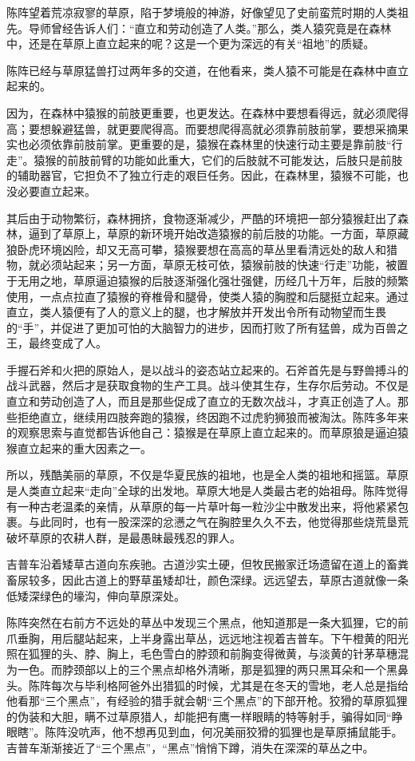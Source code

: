 \par 陈阵望着荒凉寂寥的草原，陷于梦境般的神游，好像望见了史前蛮荒时期的人类祖先。导师曾经告诉人们：“直立和劳动创造了人类。”那么，类人猿究竟是在森林中，还是在草原上直立起来的呢？这是一个更为深远的有关“祖地”的质疑。
\par 陈阵已经与草原猛兽打过两年多的交道，在他看来，类人猿不可能是在森林中直立起来的。
\par 因为，在森林中猿猴的前肢更重要，也更发达。在森林中要想看得远，就必须爬得高；要想躲避猛兽，就更要爬得高。而要想爬得高就必须靠前肢前掌，要想采摘果实也必须依靠前肢前掌。更重要的是，猿猴在森林里的快速行动主要是靠前肢“行走”。猿猴的前肢前臂的功能如此重大，它们的后肢就不可能发达，后肢只是前肢的辅助器官，它担负不了独立行走的艰巨任务。因此，在森林里，猿猴不可能，也没必要直立起来。
\par 其后由于动物繁衍，森林拥挤，食物逐渐减少，严酷的环境把一部分猿猴赶出了森林，逼到了草原上，草原的新环境开始改造猿猴的前后肢的功能。一方面，草原藏狼卧虎环境凶险，却又无高可攀，猿猴要想在高高的草丛里看清远处的敌人和猎物，就必须站起来；另一方面，草原无枝可依，猿猴前肢的快速“行走”功能，被置于无用之地，草原逼迫猿猴的后肢逐渐强化强壮强健，历经几十万年，后肢的频繁使用，一点点拉直了猿猴的脊椎骨和腿骨，使类人猿的胸膛和后腿挺立起来。通过直立，类人猿便有了人的意义上的腿，也才解放并开发出令所有动物望而生畏的“手”，并促进了更加可怕的大脑智力的进步，因而打败了所有猛兽，成为百兽之王，最终变成了人。
\par 手握石斧和火把的原始人，是以战斗的姿态站立起来的。石斧首先是与野兽搏斗的战斗武器，然后才是获取食物的生产工具。战斗使其生存，生存尔后劳动。不仅是直立和劳动创造了人，而且是那些促成了直立的无数次战斗，才真正创造了人。那些拒绝直立，继续用四肢奔跑的猿猴，终因跑不过虎豹狮狼而被淘汰。陈阵多年来的观察思索与直觉都告诉他自己：猿猴是在草原上直立起来的。而草原狼是逼迫猿猴直立起来的重大因素之一。
\par 所以，残酷美丽的草原，不仅是华夏民族的祖地，也是全人类的祖地和摇篮。草原是人类直立起来“走向”全球的出发地。草原大地是人类最古老的始祖母。陈阵觉得有一种古老温柔的亲情，从草原的每一片草叶每一粒沙尘中散发出来，将他紧紧包裹。与此同时，也有一股深深的忿懑之气在胸腔里久久不去，他觉得那些烧荒垦荒破坏草原的农耕人群，是最愚昧最残忍的罪人。
\par 
\par 吉普车沿着矮草古道向东疾驰。古道沙实土硬，但牧民搬家迁场遗留在道上的畜粪畜尿较多，因此古道上的野草虽矮却壮，颜色深绿。远远望去，草原古道就像一条低矮深绿色的壕沟，伸向草原深处。
\par 陈阵突然在右前方不远处的草丛中发现三个黑点，他知道那是一条大狐狸，它的前爪垂胸，用后腿站起来，上半身露出草丛，远远地注视着吉普车。下午橙黄的阳光照在狐狸的头、脖、胸上，毛色雪白的脖颈和前胸变得微黄，与淡黄的针茅草穗混为一色。而脖颈部以上的三个黑点却格外清晰，那是狐狸的两只黑耳朵和一个黑鼻头。陈阵每次与毕利格阿爸外出猎狐的时候，尤其是在冬天的雪地，老人总是指给他看那“三个黑点”，有经验的猎手就会朝“三个黑点”的下部开枪。狡猾的草原狐狸的伪装和大胆，瞒不过草原猎人，却能把有鹰一样眼睛的特等射手，骗得如同“睁眼瞎”。陈阵没吭声，他不想再见到血，何况美丽狡猾的狐狸也是草原捕鼠能手。吉普车渐渐接近了“三个黑点”，“黑点”悄悄下蹲，消失在深深的草丛之中。
